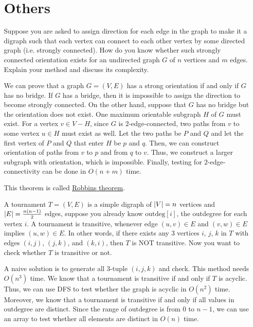 \section{Others}
\begin{Exercise}[title={Strong orientation},origin={NCKU IM 99}]
Suppose you are asked to assign direction for each edge in the graph to make it a digraph such that each vertex can connect to each other vertex by some directed graph (i.e. strongly connected). How do you know whether such strongly connected orientation exists for an undirected graph $G$ of $n$ vertices and $m$ edges. Explain your method and discuss its complexity.
\end{Exercise}
\begin{Answer}
We can prove that a graph $G = (V, E)$ has a strong orientation if and only if $G$ has no bridge. If $G$ has a bridge, then it is impossible to assign the direction to become strongly connected. On the other hand, suppose that $G$ has no bridge but the orientation does not exist. One maximum orientable subgraph $H$ of $G$ must exist. For a vertex $v \in V - H$, since $G$ is $2$-edge-connected, two paths from $v$ to some vertex $u \in H$ must exist as well. Let the two paths be $P$ and $Q$ and let the first vertex of $P$ and $Q$ that enter $H$ be $p$ and $q$. Then, we can construct orientation of paths from $v$ to $p$ and from $q$ to $v$. Thus, we construct a larger subgraph with orientation, which is impossible. Finally, testing for $2$-edge-connectivity can be done in $O(n + m)$ time.
\begin{remark} This theorem is called \href{https://en.wikipedia.org/wiki/Robbins%27_theorem}{Robbins theorem}.
\end{remark}
\end{Answer}

\begin{Exercise}[origin={NCKU CSIE 100}]
A tournament $T = (V, E)$ is a simple digraph of $\lvert V\rvert = n$ vertices and $\lvert E\rvert = \frac{n(n-1)}{2}$ edges, suppose you already know $\text{outdeg}[i]$, the outdegree for each vertex $i$. A tournament is transitive, whenever edge $(u, v) \in E$ and $(v, w) \in E$ implies $(u, w) \in E$. In other words, if there exists any $3$ vertices $i$, $j$, $k$ in $T$ with edges $(i, j)$, $(j, k)$, and $(k, i)$, then $T$ is NOT transitive. Now you want to check whether $T$ is transitive or not.
\end{Exercise}
\begin{Answer}
A naive solution is to generate all $3$-tuple $(i, j, k)$ and check. This method needs $O(n^3)$ time. We know that a tournament is transitive if and only if $T$ is acyclic. Thus, we can use DFS to test whether the graph is acyclic in $O(n^2)$ time. Moreover, we know that a tournament is transitive if and only if all values in $\text{outdegree}$ are distinct. Since the range of $\text{outdegree}$ is from $0$ to $n-1$, we can use an array to test whether all elements are distinct in $O(n)$ time.
\end{Answer}

\printbibliography[heading=subbibliography]
